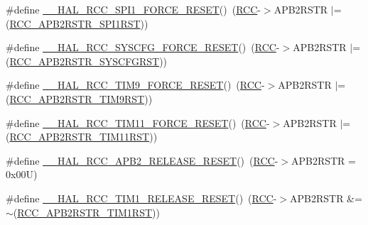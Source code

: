\begin{DoxyCompactItemize}
\item 
\#define \hyperlink{group___r_c_c___a_p_b2___force___release___reset_ga87e6bc588fa1d5ce3928d2fd2a3156a4}{\+\_\+\+\_\+\+H\+A\+L\+\_\+\+R\+C\+C\+\_\+\+S\+P\+I1\+\_\+\+F\+O\+R\+C\+E\+\_\+\+R\+E\+S\+ET}()~(\hyperlink{group___peripheral__declaration_ga74944438a086975793d26ae48d5882d4}{R\+CC}-\/$>$A\+P\+B2\+R\+S\+TR $\vert$= (\hyperlink{group___peripheral___registers___bits___definition_ga345f05d3508a9fd5128208761feb29fb}{R\+C\+C\+\_\+\+A\+P\+B2\+R\+S\+T\+R\+\_\+\+S\+P\+I1\+R\+ST}))
\item 
\#define \hyperlink{group___r_c_c___a_p_b2___force___release___reset_ga143ff27d8f59a39732efd79539e3765a}{\+\_\+\+\_\+\+H\+A\+L\+\_\+\+R\+C\+C\+\_\+\+S\+Y\+S\+C\+F\+G\+\_\+\+F\+O\+R\+C\+E\+\_\+\+R\+E\+S\+ET}()~(\hyperlink{group___peripheral__declaration_ga74944438a086975793d26ae48d5882d4}{R\+CC}-\/$>$A\+P\+B2\+R\+S\+TR $\vert$= (\hyperlink{group___peripheral___registers___bits___definition_ga813d42b8d48ae6379c053a44870af49d}{R\+C\+C\+\_\+\+A\+P\+B2\+R\+S\+T\+R\+\_\+\+S\+Y\+S\+C\+F\+G\+R\+ST}))
\item 
\#define \hyperlink{group___r_c_c___a_p_b2___force___release___reset_ga9a62b264dec3df075dc7207993a9650e}{\+\_\+\+\_\+\+H\+A\+L\+\_\+\+R\+C\+C\+\_\+\+T\+I\+M9\+\_\+\+F\+O\+R\+C\+E\+\_\+\+R\+E\+S\+ET}()~(\hyperlink{group___peripheral__declaration_ga74944438a086975793d26ae48d5882d4}{R\+CC}-\/$>$A\+P\+B2\+R\+S\+TR $\vert$= (\hyperlink{group___peripheral___registers___bits___definition_gab3aa588d4814a289d939e111492724af}{R\+C\+C\+\_\+\+A\+P\+B2\+R\+S\+T\+R\+\_\+\+T\+I\+M9\+R\+ST}))
\item 
\#define \hyperlink{group___r_c_c___a_p_b2___force___release___reset_gaeaf6b459cfeb85e2e098b78825e476f2}{\+\_\+\+\_\+\+H\+A\+L\+\_\+\+R\+C\+C\+\_\+\+T\+I\+M11\+\_\+\+F\+O\+R\+C\+E\+\_\+\+R\+E\+S\+ET}()~(\hyperlink{group___peripheral__declaration_ga74944438a086975793d26ae48d5882d4}{R\+CC}-\/$>$A\+P\+B2\+R\+S\+TR $\vert$= (\hyperlink{group___peripheral___registers___bits___definition_ga9651c8201d42ba03bb1bf89d9d39e60c}{R\+C\+C\+\_\+\+A\+P\+B2\+R\+S\+T\+R\+\_\+\+T\+I\+M11\+R\+ST}))
\item 
\#define \hyperlink{group___r_c_c___a_p_b2___force___release___reset_gae1e413d623154942d5bbe89769161ece}{\+\_\+\+\_\+\+H\+A\+L\+\_\+\+R\+C\+C\+\_\+\+A\+P\+B2\+\_\+\+R\+E\+L\+E\+A\+S\+E\+\_\+\+R\+E\+S\+ET}()~(\hyperlink{group___peripheral__declaration_ga74944438a086975793d26ae48d5882d4}{R\+CC}-\/$>$A\+P\+B2\+R\+S\+TR = 0x00\+U)
\item 
\#define \hyperlink{group___r_c_c___a_p_b2___force___release___reset_ga1857f223177c9548ce1bae9753e0a7b4}{\+\_\+\+\_\+\+H\+A\+L\+\_\+\+R\+C\+C\+\_\+\+T\+I\+M1\+\_\+\+R\+E\+L\+E\+A\+S\+E\+\_\+\+R\+E\+S\+ET}()~(\hyperlink{group___peripheral__declaration_ga74944438a086975793d26ae48d5882d4}{R\+CC}-\/$>$A\+P\+B2\+R\+S\+TR \&= $\sim$(\hyperlink{group___peripheral___registers___bits___definition_ga5bd060cbefaef05487963bbd6c48d7c6}{R\+C\+C\+\_\+\+A\+P\+B2\+R\+S\+T\+R\+\_\+\+T\+I\+M1\+R\+ST}))

\end{DoxyCompactItemize}
